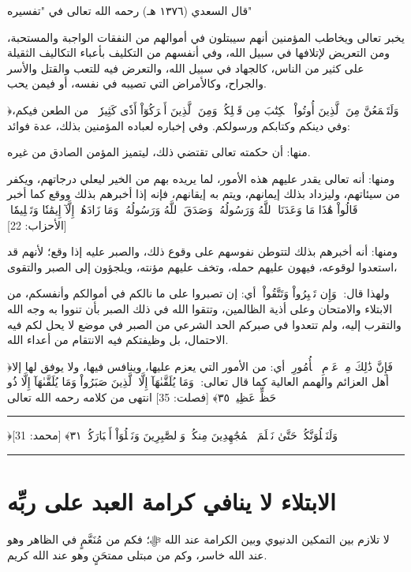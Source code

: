 \documentclass[12pt,openany]{book}
\newenvironment{quranblock}
  {\par\medskip\begin{center}\begin{minipage}{0.92\linewidth}\centering\quranfont\large\color{ink}\hrule\vspace{0.65em}}
  {\vspace{0.65em}\hrule\end{minipage}\end{center}\medskip}
\newenvironment{sourceintro}
  {\par\medskip\noindent\titlefont\color{gold}}
  {\par\smallskip}
\begin{document}
\begin{sourceintro}قال السعدي (١٣٧٦ هـ) رحمه الله تعالى في "تفسيره"\end{sourceintro}

يخبر تعالى ويخاطب المؤمنين أنهم سيبتلون في أموالهم من النفقات الواجبة والمستحبة، ومن التعريض لإتلافها في سبيل الله، وفي أنفسهم من التكليف بأعباء التكاليف الثقيلة على كثير من الناس، كالجهاد في سبيل الله، والتعرض فيه للتعب والقتل والأسر والجراح، وكالأمراض التي تصيبه في نفسه، أو فيمن يحب.

﴿وَلَتَسۡمَعُنَّ مِنَ ٱلَّذِينَ أُوتُواْ ‌ٱلۡكِتَٰبَ مِن قَبۡلِكُمۡ وَمِنَ ٱلَّذِينَ أَشۡرَكُوٓاْ أَذٗى كَثِيرٗاۚ﴾ من الطعن فيكم، وفي دينكم وكتابكم ورسولكم. وفي إخباره لعباده المؤمنين بذلك، عدة فوائد:

منها: أن حكمته تعالى تقتضي ذلك، ليتميز المؤمن الصادق من غيره.

ومنها: أنه تعالى يقدر عليهم هذه الأمور، لما يريده بهم من الخير ليعلي درجاتهم، ويكفر من سيئاتهم، وليزداد بذلك إيمانهم، ويتم به إيقانهم، فإنه إذا أخبرهم بذلك ووقع كما أخبر ﴿قَالُواْ ‌هَٰذَا ‌مَا ‌وَعَدَنَا ‌ٱللَّهُ ‌وَرَسُولُهُۥ وَصَدَقَ ٱللَّهُ وَرَسُولُهُۥۚ وَمَا زَادَهُمۡ إِلَّآ إِيمَٰنٗا وَتَسۡلِيمٗا﴾ [الأحزاب: 22]

ومنها: أنه أخبرهم بذلك لتتوطن نفوسهم على وقوع ذلك، والصبر عليه إذا وقع؛ لأنهم قد استعدوا لوقوعه، فيهون عليهم حمله، وتخف عليهم مؤنته، ويلجؤون إلى الصبر والتقوى،

ولهذا قال: ﴿وَإِن تَصۡبِرُواْ وَتَتَّقُواْ﴾ أي: إن تصبروا على ما نالكم في أموالكم وأنفسكم، من الابتلاء والامتحان وعلى أذية الظالمين، وتتقوا الله في ذلك الصبر بأن تنووا به وجه الله والتقرب إليه، ولم تتعدوا في صبركم الحد الشرعي من الصبر في موضع لا يحل لكم فيه الاحتمال، بل وظيفتكم فيه الانتقام من أعداء الله.

﴿فَإِنَّ ذَٰلِكَ مِنۡ عَزۡمِ ٱلۡأُمُورِ﴾ أي: من الأمور التي يعزم عليها، وينافس فيها، ولا يوفق لها إلا أهل العزائم والهمم العالية كما قال تعالى: ﴿‌وَمَا ‌يُلَقَّىٰهَآ ‌إِلَّا ‌ٱلَّذِينَ ‌صَبَرُواْ وَمَا يُلَقَّىٰهَآ إِلَّا ذُو حَظٍّ عَظِيمٖ ٣٥﴾ [فصلت: 35] انتهى من كلامه رحمه الله تعالى

\begin{quranblock}
﴿‌وَلَنَبۡلُوَنَّكُمۡ حَتَّىٰ نَعۡلَمَ ٱلۡمُجَٰهِدِينَ مِنكُمۡ وَٱلصَّٰبِرِينَ وَنَبۡلُوَاْ أَخۡبَارَكُمۡ ٣١﴾ [محمد: 31]
\end{quranblock}

\section{الابتلاء لا ينافي كرامة العبد على ربِّه}
لا تلازم بين التمكين الدنيوي وبين الكرامة عند الله ﷻ؛ فكم من مُنَعَّمٍ في الظاهر وهو عند الله خاسر، وكم من مبتلى ممتحَنٍ وهو عند الله كريم.
\end{document}
